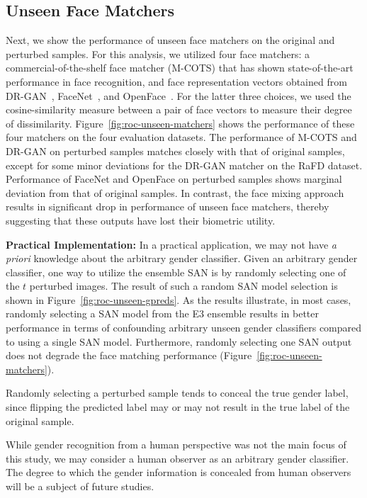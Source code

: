 \documentclass[10pt,twocolumn,letterpaper]{article}
\begin{document}
\subsection{Unseen Face Matchers}

Next, we show the performance of unseen face matchers on the original and perturbed samples. For this analysis, we utilized four face matchers: a commercial-of-the-shelf face matcher (M-COTS) that has shown state-of-the-art performance in face recognition, and  face representation vectors obtained from DR-GAN~\cite{tran_disentangled_2017},  FaceNet~\cite{schroff_facenet_2015}, and OpenFace~\cite{amos_openface_2016}. For the latter three choices, we used the cosine-similarity measure between a pair of face vectors to measure their degree of dissimilarity.
Figure~\ref{fig:roc-unseen-matchers} shows the performance of these four matchers on the four evaluation datasets. The performance of M-COTS and DR-GAN on perturbed samples matches closely with that of original samples, except for some minor deviations for the DR-GAN matcher on the RaFD dataset. Performance of FaceNet and OpenFace on perturbed samples shows marginal deviation from that of original samples. In contrast, the face mixing approach~\cite{othman_privacy_2014} results in significant drop in performance of unseen face matchers, thereby suggesting that these outputs have lost their biometric utility.

 
{\bf Practical Implementation:} In a practical application, we may not have \emph{a priori} knowledge about the arbitrary gender classifier. Given an arbitrary gender classifier, one way to utilize the ensemble SAN is by randomly selecting one of the $t$ perturbed images. The result of such a random SAN model selection is shown in Figure~\ref{fig:roc-unseen-gpreds}. As the results illustrate, in most cases, randomly selecting a SAN model from the E3 ensemble results in better performance in terms of confounding arbitrary unseen gender classifiers compared to using a single SAN model. Furthermore, randomly selecting one SAN output does not degrade the face matching performance (Figure~\ref{fig:roc-unseen-matchers}).

Randomly selecting a perturbed sample tends to conceal the true gender label, since flipping the predicted label may or may not result in the true label of the original sample.

While gender recognition from a human perspective was not the main focus of this study, we may consider a human observer as an arbitrary gender classifier. The degree to which the gender information is concealed from human observers will be a subject of future studies. 
\end{document}
